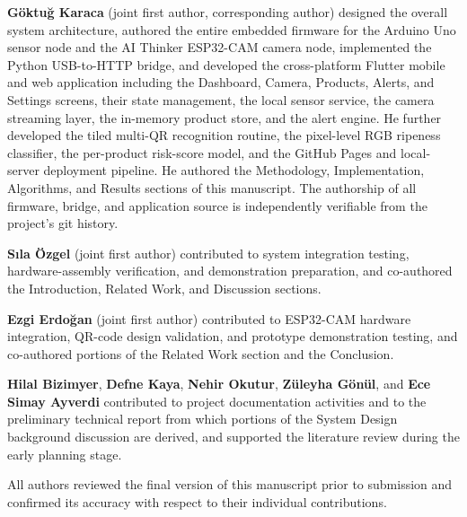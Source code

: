 
\textbf{Göktuğ Karaca} (joint first author, corresponding author)
designed the overall system architecture, authored the entire
embedded firmware for the Arduino Uno sensor node and the AI Thinker
ESP32-CAM camera node, implemented the Python USB-to-HTTP bridge,
and developed the cross-platform Flutter mobile and web application
including the Dashboard, Camera, Products, Alerts, and Settings
screens, their state management, the local sensor service, the
camera streaming layer, the in-memory product store, and the alert
engine. He further developed the tiled multi-QR recognition routine,
the pixel-level RGB ripeness classifier, the per-product risk-score
model, and the GitHub Pages and local-server deployment pipeline. He
authored the Methodology, Implementation, Algorithms, and Results
sections of this manuscript. The authorship of all firmware, bridge,
and application source is independently verifiable from the project's
git history.

\textbf{Sıla Özgel} (joint first author) contributed to system
integration testing, hardware-assembly verification, and demonstration
preparation, and co-authored the Introduction, Related Work, and
Discussion sections.

\textbf{Ezgi Erdoğan} (joint first author) contributed to ESP32-CAM
hardware integration, QR-code design validation, and prototype
demonstration testing, and co-authored portions of the Related Work
section and the Conclusion.

\textbf{Hilal Bizimyer}, \textbf{Defne Kaya}, \textbf{Nehir Okutur},
\textbf{Züleyha Gönül}, and \textbf{Ece Simay Ayverdi} contributed
to project documentation activities and to the preliminary technical
report from which portions of the System Design background discussion
are derived, and supported the literature review during the early
planning stage.

All authors reviewed the final version of this manuscript prior to
submission and confirmed its accuracy with respect to their
individual contributions.
